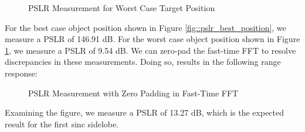 \documentclass[conference]{IEEEtran}
\begin{document}
	\begin{figure}[H]
	    	\centering
	    	\caption{PSLR Measurement for Worst Case Target Position}
	    	\label{fig::pslr_worst_position}
	\end{figure}
	
	For the best case object position shown in Figure \ref{fig::pslr_best_position}, we measure a PSLR of 146.91 dB. For the worst case object position shown in Figure \ref{fig::pslr_worst_position}, we measure a PSLR of 9.54 dB. We can zero-pad the fast-time FFT to resolve discrepancies in these measurements. Doing so, results in the following range response:
	
	\begin{figure}[H]
	    	\centering
	    	\caption{PSLR Measurement with Zero Padding in Fast-Time FFT}
	    	\label{fig::pslr_zpad}
	\end{figure}
	
	Examining the figure, we measure a PSLR of 13.27 dB, which is the expected result for the first sinc sidelobe.
	
\end{document}
